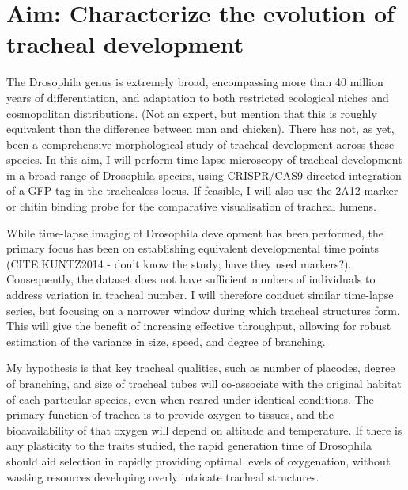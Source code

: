 \documentclass{proposal}
\begin{document}
\section{Aim: Characterize the evolution of tracheal development}

The Drosophila genus is extremely broad, encompassing more than 40 million years of differentiation, and adaptation to both restricted ecological niches and cosmopolitan distributions. (Not an expert, but mention that this is roughly equivalent than the difference between man and chicken). There has not, as yet, been a comprehensive morphological study of tracheal development across these species.  In this aim, I will perform time lapse microscopy of tracheal development in a broad range of Drosophila species, using CRISPR/CAS9 directed integration of a GFP tag in the trachealess locus. If feasible, I will also use the 2A12 marker or chitin binding probe for the comparative visualisation of tracheal lumens.


While time-lapse imaging of Drosophila development has been performed, the primary focus has been on establishing equivalent developmental time points (CITE:KUNTZ2014 - don't know the study; have they used markers?).  Consequently, the dataset does not have sufficient numbers of individuals to address variation in tracheal number.  I will therefore conduct similar time-lapse series, but focusing on a narrower window during which tracheal structures form.  This will give the benefit of increasing effective throughput, allowing for robust estimation of the variance in size, speed, and degree of branching. 

My hypothesis is that key tracheal qualities, such as number of placodes, degree of branching, and size of tracheal tubes will co-associate with the original habitat of each particular species, even when reared under identical conditions.  The primary function of trachea is to provide oxygen to tissues, and the bioavailability of that oxygen will depend on altitude and temperature. If there is any plasticity to the traits studied, the rapid generation time of Drosophila should aid selection in rapidly providing optimal levels of oxygenation, without wasting resources developing overly intricate tracheal structures. 

\end{document}
